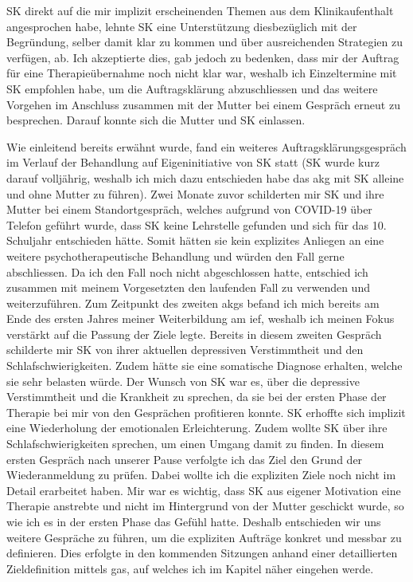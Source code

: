 SK direkt auf die mir implizit erscheinenden Themen aus dem Klinikaufenthalt angesprochen habe, lehnte SK eine Unterstützung diesbezüglich mit der Begründung, selber damit klar zu kommen und über ausreichenden Strategien zu verfügen, ab. Ich akzeptierte dies, gab jedoch zu bedenken, dass mir der Auftrag für eine Therapieübernahme noch nicht klar war, weshalb ich Einzeltermine mit SK empfohlen habe, um die Auftragsklärung abzuschliessen und das weitere Vorgehen im Anschluss zusammen mit der Mutter bei einem Gespräch erneut zu besprechen. Darauf konnte sich die Mutter und SK einlassen.

Wie einleitend bereits erwähnt wurde, fand ein weiteres Auftragsklärungsgespräch im Verlauf der Behandlung auf Eigeninitiative von SK statt (SK wurde kurz darauf volljährig, weshalb ich mich dazu entschieden habe das \ac{akg} mit SK alleine und ohne Mutter zu führen). Zwei Monate zuvor schilderten mir SK und ihre Mutter bei einem Standortgespräch, welches aufgrund von COVID-19 über Telefon geführt wurde, dass SK keine Lehrstelle gefunden und sich für das 10. Schuljahr entschieden hätte. Somit hätten sie kein explizites Anliegen an eine weitere psychotherapeutische Behandlung und würden den Fall gerne abschliessen. Da ich den Fall noch nicht abgeschlossen hatte, entschied ich zusammen mit meinem Vorgesetzten den laufenden Fall zu verwenden und weiterzuführen. Zum Zeitpunkt des zweiten \acp{akg} befand ich mich bereits am Ende des ersten Jahres meiner Weiterbildung am \ac{ief}, weshalb ich meinen Fokus verstärkt auf die Passung der Ziele legte. Bereits in diesem zweiten Gespräch schilderte mir SK von ihrer aktuellen depressiven Verstimmtheit und den Schlafschwierigkeiten. Zudem hätte sie eine somatische Diagnose erhalten, welche sie sehr belasten würde. Der Wunsch von SK war es, über die depressive Verstimmtheit und die Krankheit zu sprechen, da sie bei der ersten Phase der Therapie bei mir von den Gesprächen profitieren konnte. SK erhoffte sich implizit eine Wiederholung der emotionalen Erleichterung. Zudem wollte SK über ihre Schlafschwierigkeiten sprechen, um einen Umgang damit zu finden. In diesem ersten Gespräch nach unserer Pause verfolgte ich das Ziel den Grund der Wiederanmeldung zu prüfen. Dabei wollte ich die expliziten Ziele noch nicht im Detail erarbeitet haben. Mir war es wichtig, dass SK aus eigener Motivation eine Therapie anstrebte und nicht im Hintergrund von der Mutter geschickt wurde, so wie ich es in der ersten Phase das Gefühl hatte. Deshalb entschieden wir uns weitere Gespräche zu führen, um die expliziten Aufträge konkret und messbar zu definieren. Dies erfolgte in den kommenden Sitzungen anhand einer detaillierten Zieldefinition mittels \ac{gas}, auf welches ich im Kapitel  näher eingehen werde.

